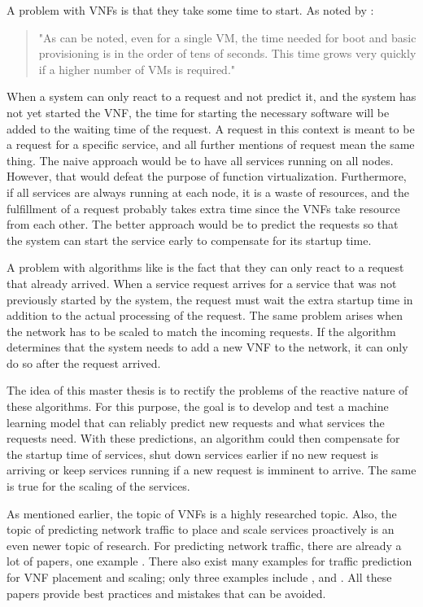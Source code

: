 \documentclass[12pt,a4paper]{scrartcl}
\begin{document}
	A problem with VNFs is that they take some time to start.
	As noted by \cite[p.108-109]{Mijumbi}:
	\begin{quote}
		"As can be noted, even for a single VM, the time needed for boot and basic provisioning is in the order of tens of seconds. This time grows very quickly if a higher number of VMs is required."
	\end{quote}
	When a system can only react to a request and not predict it, and the system has not yet started the VNF, the time for starting the necessary software will be added to the waiting time of the request.
	A request in this context is meant to be a request for a specific service, and all further mentions of request mean the same thing.
	The naive approach would be to have all services running on all nodes.
	However, that would defeat the purpose of function virtualization.
	Furthermore, if all services are always running at each node, it is a waste of resources, and the fulfillment of a request probably takes extra time since the VNFs take resource from each other.
	The better approach would be to predict the requests so that the system can start the service early to compensate for its startup time.
	
	A problem with algorithms like \cite{draxlerScaling} is the fact that they can only react to a request that already arrived.
	When a service request arrives for a service that was not previously started by the system, the request must wait the extra startup time in addition to the actual processing of the request.
	The same problem arises when the network has to be scaled to match the incoming requests.
	If the algorithm determines that the system needs to add a new VNF to the network, it can only do so after the request arrived.
	
	The idea of this master thesis is to rectify the problems of the reactive nature of these algorithms.
	For this purpose, the goal is to develop and test a machine learning model that can reliably predict new requests and what services the requests need.
	With these predictions, an algorithm could then compensate for the startup time of services, shut down services earlier if no new request is arriving or keep services running if a new request is imminent to arrive.
	The same is true for the scaling of the services.
	
	As mentioned earlier, the topic of VNFs is a highly researched topic.
	Also, the topic of predicting network traffic to place and scale services proactively is an even newer topic of research.
	For predicting network traffic, there are already a lot of papers, one example \cite{networkStudies}.
	There also exist many examples for traffic prediction for VNF placement and scaling; only three examples include \cite{8486320}, \cite{10.1007/978-3-319-70087-8_90} and \cite{7502957}.
	All these papers provide best practices and mistakes that can be avoided.
	
\end{document}
